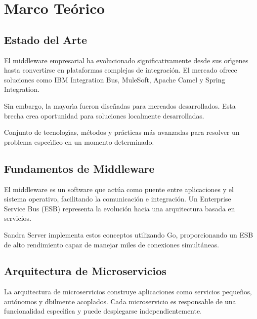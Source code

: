 \chapter{Marco Te\'orico}

\section{Estado del Arte}

El middleware empresarial ha evolucionado significativamente desde sus or\'{\i}genes hasta convertirse en plataformas complejas de integraci\'on. El mercado ofrece soluciones como IBM Integration Bus, MuleSoft, Apache Camel y Spring Integration.

Sin embargo, la mayor\'{\i}a fueron dise\~nadas para mercados desarrollados. Esta brecha crea oportunidad para soluciones localmente desarrolladas.

\begin{definicion}
\item[Estado del Arte] Conjunto de tecnolog\'{\i}as, m\'etodos y pr\'acticas m\'as avanzadas para resolver un problema espec\'{\i}fico en un momento determinado.
\end{definicion}

\section{Fundamentos de Middleware}

El middleware es un software que act\'ua como puente entre aplicaciones y el sistema operativo, facilitando la comunicaci\'on e integraci\'on. Un Enterprise Service Bus (ESB) representa la evoluci\'on hacia una arquitectura basada en servicios.

Sandra Server implementa estos conceptos utilizando Go, proporcionando un ESB de alto rendimiento capaz de manejar miles de conexiones simult\'aneas.

\section{Arquitectura de Microservicios}

La arquitectura de microservicios construye aplicaciones como servicios peque\~nos, aut\'onomos y dbilmente acoplados. Cada microservicio es responsable de una funcionalidad espec\'{\i}fica y puede desplegarse independientemente.

